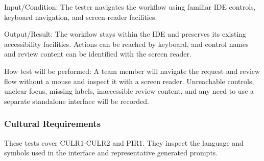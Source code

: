 \documentclass[12pt, titlepage]{article}
\begin{document}
\begin{enumerate}
Input/Condition: The tester navigates the workflow using familiar IDE
controls, keyboard navigation, and screen-reader facilities.

Output/Result: The workflow stays within the IDE and preserves its existing
accessibility facilities. Actions can be reached by keyboard, and control
names and review content can be identified with the screen reader.

How test will be performed: A team member will navigate the request and review
flow without a mouse and inspect it with a screen reader. Unreachable
controls, unclear focus, missing labels, inaccessible review content, and any
need to use a separate standalone interface will be recorded.

\end{enumerate}

\subsubsection{Cultural Requirements}

These tests cover CULR1-CULR2 and PIR1. They inspect the language and symbols
used in the interface and representative generated prompts.
\end{document}
